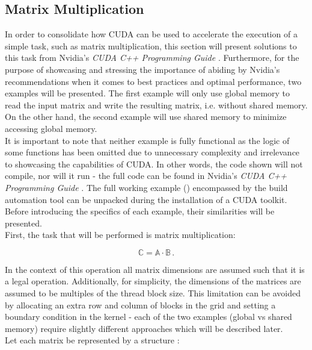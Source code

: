 \subsection{Matrix Multiplication}\label{Subsection:matrix-multiplication}
In order to consolidate how CUDA can be used to accelerate the execution of a simple task, such as matrix multiplication, this section will present solutions to this task from Nvidia's \emph{CUDA C++ Programming Guide} \cite{NVIDIAMay2022}. Furthermore, for the purpose of showcasing and stressing the importance of abiding by Nvidia's recommendations when it comes to best practices and optimal performance, two examples will be presented. The first example will only use global memory to read the input matrix and write the resulting matrix, i.e. without shared memory. On the other hand, the second example will use shared memory to minimize accessing global memory. \\
It is important to note that neither example is fully functional as the logic of some functions has been omitted due to unnecessary complexity and irrelevance to showcasing the capabilities of CUDA. In other words, the code shown will not compile, nor will it run - the full code can be found in Nvidia's \emph{CUDA C++ Programming Guide} \cite{NVIDIAMay2022}. The full working example () encompassed by the build automation tool  can be unpacked during the installation of a CUDA toolkit. \\
Before introducing the specifics of each example, their similarities will be presented. \\
First, the task that will be performed is matrix multiplication:

\begin{equation}\label{Equation:matrix-multiplication-definition}
	\mathbb{C} = \mathbb{A} \cdot \mathbb{B} \,.
\end{equation}

In the context of this operation all matrix dimensions are assumed such that it is a legal operation. Additionally, for simplicity, the dimensions of the matrices are assumed to be multiples of the thread block size. This limitation can be avoided by allocating an extra row and column of blocks in the grid and setting a boundary condition in the kernel - each of the two examples (global vs shared memory) require slightly different approaches which will be described later. \\
Let each matrix be represented by a structure :

